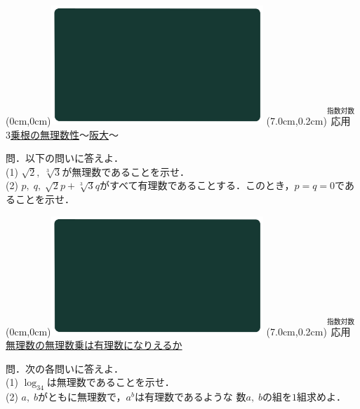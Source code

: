 \documentclass[10pt,
fleqn,
dvipdfmx,
uplatex
]{jsarticle}
\begin{document}
\bf\boldmath



\at(0cm,0cm){\includegraphics[width=8cm,bb=0 0 1920 1080]{./youtube/thumbnails/templates/smart_background/指数対数.jpeg}}
\at(7.0cm,0.2cm){\small\color{bradorange}$\overset{\text{指数対数}}{\text{応用}}$}
{\color{orange}\Large\underline{$3$乗根の無理数性$〜$阪大$〜$}}\vspace{0.3zw}

\normalsize 
問．以下の問いに答えよ．\\
(1)  $\sqrt 2,\;\sqrt[3]3$が無理数であることを示せ．\\
(2)  $p,\;q,\;\sqrt 2p+\sqrt[3]3q$がすべて有理数であることする．このとき，$p=q=0$であることを示せ．\\



\newpage



\at(0cm,0cm){\includegraphics[width=8cm,bb=0 0 1920 1080]{./youtube/thumbnails/templates/smart_background/指数対数.jpeg}}
\at(7.0cm,0.2cm){\small\color{bradorange}$\overset{\text{指数対数}}{\text{応用}}$}
{\color{orange}\normalsize\underline{無理数の無理数乗は有理数になりえるか}}\vspace{0.3zw}

\normalsize 
問．次の各問いに答えよ．\\
(1)  $\log _34$は無理数であることを示せ．\\
(2)  $a,\;b$がともに無理数で，$a^b$は有理数であるような
数$a,\;b$の組を$1$組求めよ．\\
\end{document}
